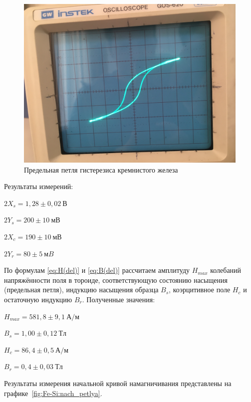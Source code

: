 \documentclass[a4paper, 12pt]{article}
\begin{document}
\begin{figure}[h!]
\begin{center}
    \includegraphics[scale=0.07]{Fe-Si.jpg}
\end{center}
\caption{Предельная петля гистерезиса кремнистого железа}
\label{fig:Fe-Si:petlya}
\end{figure}

Результаты измерений:
\begin{description}
\item{} $2X_s = 1,28\pm0,02~В$
\item{} $2Y_s = 200\pm10~мВ$
\item{} $2X_c = 190\pm10~мВ$
\item{} $2Y_r = 80\pm5~мB$
\end{description}

По формулам \eqref{eq:H(del)} и \eqref{eq:B(del)} рассчитаем амплитуду $H_{max}$ колебаний напряжённости поля в тороиде, соответствующую состоянию насыщения (предельная петля), индукцию насыщения образца $B_s$, коэрцитивное поле $H_c$ и остаточную индукцию $B_r$. Полученные значения:
\begin{description}
\item{} $H_{max} = 581,8\pm9,1~А/м$
\item{} $B_s = 1,00\pm0,12~Тл$
\item{} $H_c = 86,4\pm0,5~А/м$
\item{} $B_r = 0,4\pm0,03~Тл$
\end{description}

Результаты измерения начальной кривой намагничивания представлены на графике~\ref{fig:Fe-Si:nach_petlya}.
\end{document}
